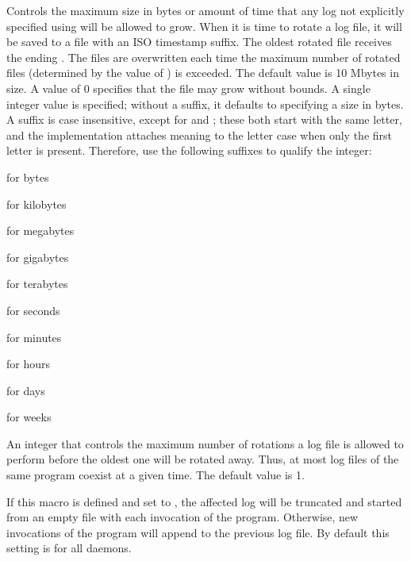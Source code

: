 \begin{description}
\label{param:MaxDefaultLog}
\item[\Macro{MAX\_DEFAULT\_LOG}]
\begin{description} 
  Controls the maximum size in bytes or amount of time that any log
  not explicitly specified using  
  will be allowed to grow.
  When it is time to rotate a log file,
  it will be saved to a file with an ISO timestamp suffix. 
  The oldest rotated file receives the ending . 
  The  files are overwritten each time the maximum 
  number of rotated files (determined by the value of
  ) is exceeded.
  The default value is 10 Mbytes in size.
  A value of 0 specifies that the file may grow without bounds. 
  A single integer value is specified; without a suffix, it defaults to
  specifying a size in bytes.  A suffix is case insensitive, except for
   and ; these both start with the same letter, and
  the implementation attaches meaning to the letter case when only the first
  letter is present. Therefore, use the following suffixes to
  qualify the integer:
  \item{ for bytes}
  \item{ for kilobytes}
  \item{ for megabytes}
  \item{ for gigabytes}
  \item{ for terabytes}
  \item{ for seconds}
  \item{ for minutes}
  \item{ for hours}
  \item{ for days}
  \item{ for weeks}
\end{description} 

\label{param:MaxNumSubsysLog}
\item[\Macro{MAX\_NUM\_<SUBSYS>\_LOG}]
  An integer that controls the maximum number of rotations a log file 
  is allowed to perform before the oldest one will be 
  rotated away. Thus, at most 
  log files of the same program coexist at a given time.
  The default value is 1.

\label{param:TruncSubsysLogOnOpen}
\item[\Macro{TRUNC\_<SUBSYS>\_LOG\_ON\_OPEN}]
  If this macro is defined and set
  to , the affected log will be truncated and started from an
  empty file with each invocation of the program.  Otherwise, new
  invocations of the program will append to the previous log
  file.  By default this setting is  for all daemons.
  

\end{description}
